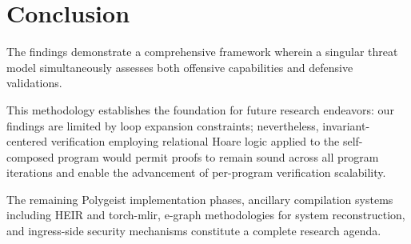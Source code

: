 \section{Conclusion}
\label{sec:conclusion}

The findings demonstrate a comprehensive framework wherein a singular threat model simultaneously assesses both offensive capabilities and defensive validations.

This methodology establishes the foundation for future research endeavors: our findings are limited by loop expansion constraints; nevertheless, invariant-centered verification employing relational Hoare logic applied to the self-composed program would permit proofs to remain sound across all program iterations and enable the advancement of per-program verification scalability.

The remaining Polygeist implementation phases, ancillary compilation systems including HEIR and torch-mlir, e-graph methodologies for system reconstruction, and ingress-side security mechanisms constitute a complete research agenda.